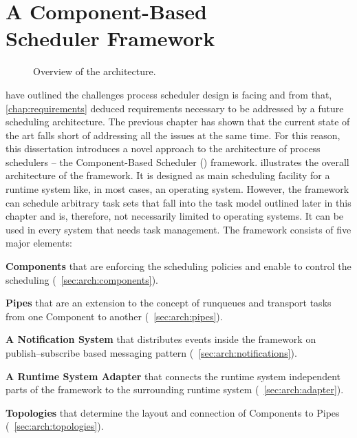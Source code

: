 \chapter[A Component-Based Scheduler Framework]{A Component-Based\\Scheduler Framework}%
\label{chap:arch}

\begin{figure} \centering
	\caption{Overview of the \cobas{} architecture.}%
	\label{fig:arch:overview}
\end{figure}

 have outlined the challenges process scheduler design is facing and from that, \cref{chap:requirements} deduced requirements necessary to be addressed by a future scheduling architecture. The previous chapter has shown that the current state of the art falls short of addressing all the issues at the same time. For this reason, this dissertation introduces a novel approach to the architecture of process schedulers -- the Component-Based Scheduler (\cobas{}) framework.  illustrates the overall architecture of the framework. It is designed as main scheduling facility for a runtime system like, in most cases, an operating system. However, the framework can schedule arbitrary task sets that fall into the task model outlined later in this chapter and is, therefore, not necessarily limited to operating systems. It can be used in every system that needs task management. The \cobas{} framework consists of five major elements:

\begin{itemize*}
	\item \textbf{Components} that are enforcing the scheduling policies and enable to control the scheduling (\cf{}~\cref{sec:arch:components}).
	\item \textbf{Pipes} that are an extension to the concept of runqueues and transport tasks from one Component to another (\cf{}~\cref{sec:arch:pipes}).
	\item \textbf{A Notification System} that distributes events inside the framework on publish–subscribe based messaging pattern (\cf{}~\cref{sec:arch:notifications}).
	\item \textbf{A Runtime System Adapter} that connects the runtime system independent parts of the \cobas{} framework to the surrounding runtime system (\cf{}~\cref{sec:arch:adapter}).
	\item \textbf{Topologies} that determine the layout and connection of Components to Pipes (\cf{}~\cref{sec:arch:topologies}).
\end{itemize*}

